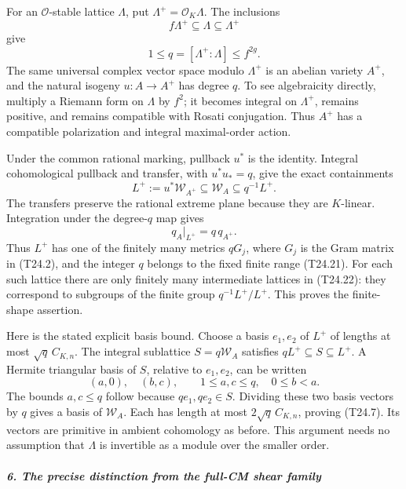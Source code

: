 For an \(\mathcal O\)-stable lattice \(\Lambda\), put \(\Lambda^+=\mathcal O_K\Lambda\). The inclusions \[
 f\Lambda^+\subseteq\Lambda\subseteq\Lambda^+
 \tag{T24.20}
\] give \[
 1\le q=[\Lambda^+:\Lambda]\le f^{2g}.
 \tag{T24.21}
\] The same universal complex vector space modulo \(\Lambda^+\) is an abelian variety \(A^+\), and the natural isogeny \(u:A\to A^+\) has degree \(q\). To see algebraicity directly, multiply a Riemann form on \(\Lambda\) by \(f^2\); it becomes integral on \(\Lambda^+\), remains positive, and remains compatible with Rosati conjugation. Thus \(A^+\) has a compatible polarization and integral maximal-order action.

Under the common rational marking, pullback \(u^*\) is the identity. Integral cohomological pullback and transfer, with \(u^*u_*=q\), give the exact containments \[
 L^+:=u^*\mathscr W_{A^+}
      \subseteq\mathscr W_A
      \subseteq q^{-1}L^+.
 \tag{T24.22}
\] The transfers preserve the rational extreme plane because they are \(K\)-linear. Integration under the degree-\(q\) map gives \[
 q_A|_{L^+}=q\,q_{A^+}.
 \tag{T24.23}
\] Thus \(L^+\) has one of the finitely many metrics \(qG_j\), where \(G_j\) is the Gram matrix in (T24.2), and the integer \(q\) belongs to the fixed finite range (T24.21). For each such lattice there are only finitely many intermediate lattices in (T24.22): they correspond to subgroups of the finite group \(q^{-1}L^+/L^+\). This proves the finite-shape assertion.

Here is the stated explicit basis bound. Choose a basis \(e_1,e_2\) of \(L^+\) of lengths at most \(\sqrt q\,C_{K,n}\). The integral sublattice \(S=q\mathscr W_A\) satisfies \(qL^+\subseteq S\subseteq L^+\). A Hermite triangular basis of \(S\), relative to \(e_1,e_2\), can be written \[
 (a,0),\quad (b,c),\qquad
 1\le a,c\le q,\quad 0\le b<a.
 \tag{T24.24}
\] The bounds \(a,c\le q\) follow because \(q e_1,q e_2\in S\). Dividing these two basis vectors by \(q\) gives a basis of \(\mathscr W_A\). Each has length at most \(2\sqrt q\,C_{K,n}\), proving (T24.7). Its vectors are primitive in ambient cohomology as before. This argument needs no assumption that \(\Lambda\) is invertible as a module over the smaller order.

\subparagraph{6. The precise distinction from the full-CM shear family}\label{the-precise-distinction-from-the-full-cm-shear-family}

